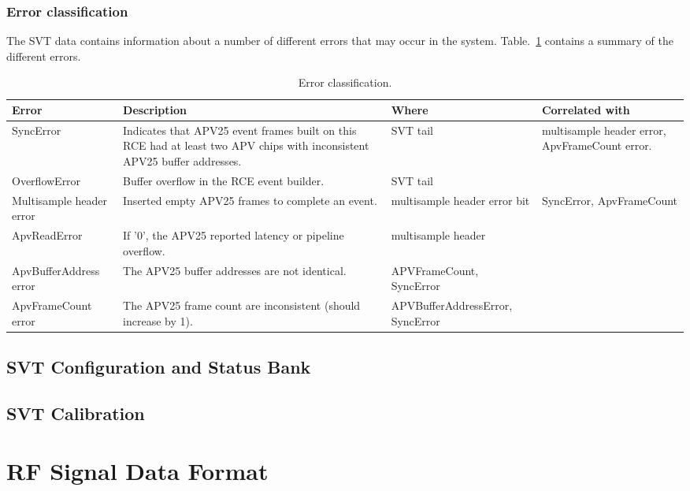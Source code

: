 \documentclass{desyproc}
\begin{document}
\subsubsection{Error classification}
The SVT data contains information about a number of different errors that may occur in the system. Table.~\ref{tab:errors} contains a summary 
of the different errors.
\begin{table}[]
  \begin{center}
    \caption{Error classification.}
    \label{tab:errors}
    \begin{tabular}{p{2cm}p{6cm}p{2cm}p{2cm}}
   	\hline
    	\bf Error & \bf Description & \bf Where & \bf Correlated with\\
	\hline
    	SyncError & Indicates that APV25 event frames built on this RCE had at least two APV chips with inconsistent APV25 buffer addresses.  & SVT tail & multisample header error, ApvFrameCount error. \\
	\hline
	OverflowError & Buffer overflow in the RCE event builder. & SVT tail & \\ 
	\hline
	Multisample header error & Inserted empty APV25 frames to complete an event. & multisample header error bit & SyncError, ApvFrameCount\\ 
	\hline
	ApvReadError & If '0', the APV25 reported latency or pipeline overflow. & multisample header  & \\ 
	\hline
	ApvBufferAddress error & The APV25 buffer addresses are not identical. & APVFrameCount, SyncError  & \\ 
	\hline
	ApvFrameCount error & The APV25 frame count are inconsistent (should increase by 1). & APVBufferAddressError, SyncError  & \\ 	
	\hline
      \end{tabular}
  \end{center}
\end{table}


\subsection{SVT Configuration and Status Bank}

\subsection{SVT Calibration}


\section{RF Signal Data Format}
\end{document}
